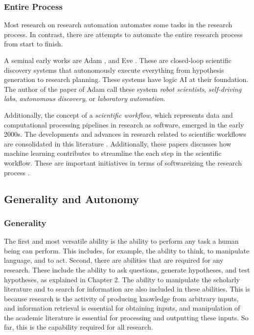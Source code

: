 \subsubsection{Entire Process}
Most research on research automation automates some tasks in the research process. In contrast, there are attempts to automate the entire research process from start to finish.

A seminal early works are Adam \cite{king2004functional}, and Eve \cite{williams2015cheaper}. These are closed-loop scientific discovery systems that autonomously execute everything from hypothesis generation to research planning. These systems have logic AI at their foundation. The author of the paper of Adam call these system \textit{robot scientists}, \textit{self-driving labs}, \textit{autonomous discovery}, or \textit{laboratory automation}.

Additionally, the concept of a \textit{scientific workflow}, which represents data and computational processing pipelines in research as software, emerged in the early 2000s. The developments and advances in research related to scientific workflows are consolidated in this literature \cite{barker2008scientific,atkinson2017scientific}. Additionally, these papers \cite{deelman2019role,nouri2021exploring} discusses how machine learning contributes to streamline the each step in the scientific workflow. These are important initiatives in terms of softwareizing the research process \cite{deelman2015pegasus,gil2011semantic}.

\subsection{Generality and Autonomy}

\subsubsection{Generality}
The first and most versatile ability is the ability to perform any task a human being can perform. This includes, for example, the ability to think, to manipulate language, and to act. Second, there are abilities that are required for any research. These include the ability to ask questions, generate hypotheses, and test hypotheses, as explained in Chapter 2. The ability to manipulate the scholarly literature and to search for information are also included in these abilities. This is because research is the activity of producing knowledge from arbitrary inputs, and information retrieval is essential for obtaining inputs, and manipulation of the academic literature is essential for processing and outputting these inputs. So far, this is the capability required for all research.

